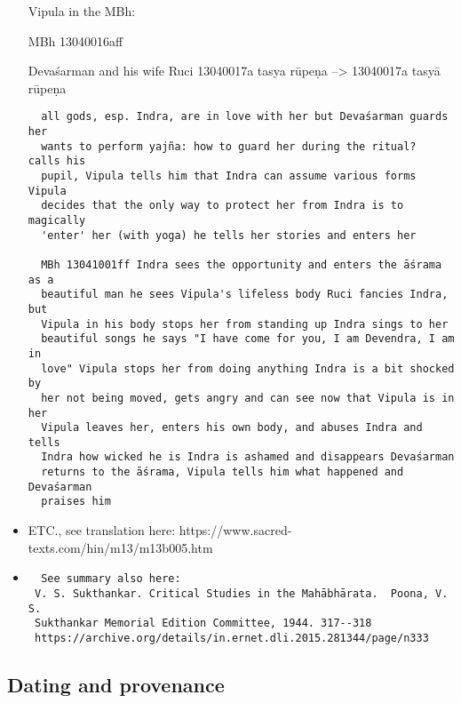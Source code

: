 \documentclass[]{article}
\begin{document}
\begin{itemize}
  Vipula in the MBh:

  MBh 13040016aff

  Devaśarman and his wife Ruci 13040017a tasya rūpeṇa --\textgreater{}
  13040017a tasyā rūpeṇa

\begin{verbatim}
  all gods, esp. Indra, are in love with her but Devaśarman guards her
  wants to perform yajña: how to guard her during the ritual?  calls his
  pupil, Vipula tells him that Indra can assume various forms Vipula
  decides that the only way to protect her from Indra is to magically
  'enter' her (with yoga) he tells her stories and enters her 

  MBh 13041001ff Indra sees the opportunity and enters the āśrama as a
  beautiful man he sees Vipula's lifeless body Ruci fancies Indra, but
  Vipula in his body stops her from standing up Indra sings to her
  beautiful songs he says "I have come for you, I am Devendra, I am in
  love" Vipula stops her from doing anything Indra is a bit shocked by
  her not being moved, gets angry and can see now that Vipula is in her
  Vipula leaves her, enters his own body, and abuses Indra and tells
  Indra how wicked he is Indra is ashamed and disappears Devaśarman
  returns to the āśrama, Vipula tells him what happened and Devaśarman
  praises him
\end{verbatim}
\item
  ETC., see translation here:
  https://www.sacred-texts.com/hin/m13/m13b005.htm
\item
\begin{verbatim}
  See summary also here:
 V. S. Sukthankar. Critical Studies in the Mahābhārata.  Poona, V. S.
 Sukthankar Memorial Edition Committee, 1944. 317--318
 https://archive.org/details/in.ernet.dli.2015.281344/page/n333
\end{verbatim}
\end{itemize}

\hypertarget{dating-and-provenance}{%
\subsection{Dating and provenance}\label{dating-and-provenance}}
\end{document}
